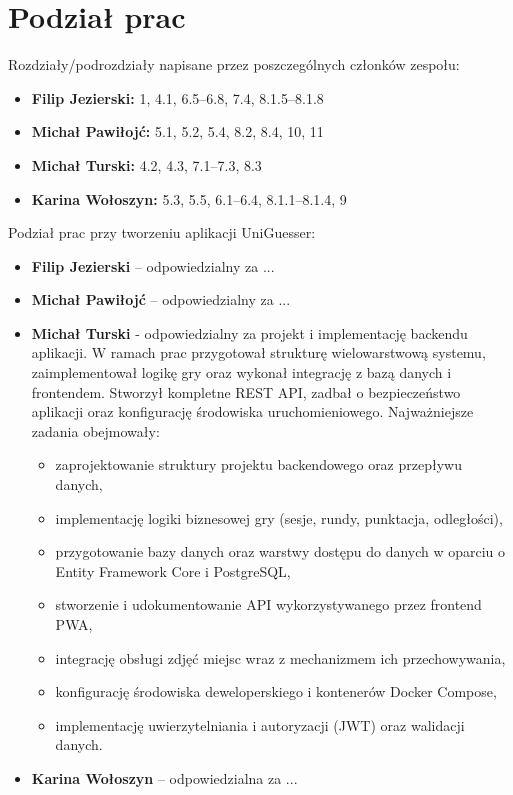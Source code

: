 \chapter{Podział prac}
\label{chap:work_distribution}

Rozdziały/podrozdziały napisane przez poszczególnych członków zespołu:
\begin{itemize}
    \item \textbf{Filip Jezierski:} 1, 4.1, 6.5--6.8, 7.4, 8.1.5--8.1.8
    \item \textbf{Michał Pawiłojć:} 5.1, 5.2, 5.4, 8.2, 8.4, 10, 11
    \item \textbf{Michał Turski:} 4.2, 4.3, 7.1--7.3, 8.3
    \item \textbf{Karina Wołoszyn:} 5.3, 5.5, 6.1--6.4, 8.1.1--8.1.4, 9
\end{itemize}

Podział prac przy tworzeniu aplikacji UniGuesser:

\begin{itemize}
    \item \textbf{Filip Jezierski} – odpowiedzialny za ...
    \item \textbf{Michał Pawiłojć} – odpowiedzialny za ...
    \item \textbf{Michał Turski} -  odpowiedzialny za projekt i implementację backendu aplikacji. W ramach prac przygotował strukturę wielowarstwową systemu, zaimplementował logikę gry oraz wykonał integrację z bazą danych i frontendem. Stworzył kompletne REST API, zadbał o bezpieczeństwo aplikacji oraz konfigurację środowiska uruchomieniowego.
        Najważniejsze zadania obejmowały:
        \begin{itemize}
        \item zaprojektowanie struktury projektu backendowego oraz przepływu danych,
        \item implementację logiki biznesowej gry (sesje, rundy, punktacja, odległości),
        \item przygotowanie bazy danych oraz warstwy dostępu do danych w oparciu o Entity Framework Core i PostgreSQL,
        \item stworzenie i udokumentowanie API wykorzystywanego przez frontend PWA,
        \item integrację obsługi zdjęć miejsc wraz z mechanizmem ich przechowywania,
        \item konfigurację środowiska deweloperskiego i kontenerów Docker Compose,
        \item implementację uwierzytelniania i autoryzacji (JWT) oraz walidacji danych.
        \end{itemize}

    \item \textbf{Karina Wołoszyn} – odpowiedzialna za ...
    \end{itemize}